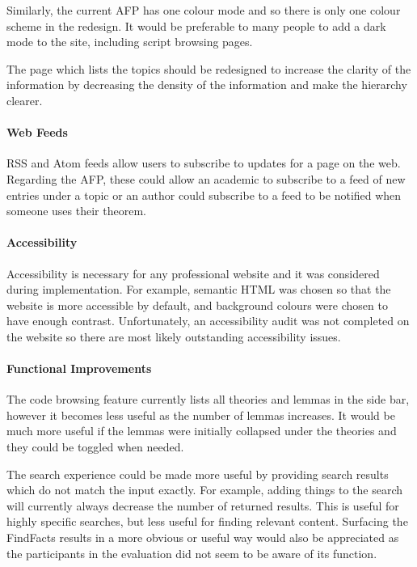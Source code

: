 \documentclass[bsc,frontabs,oneside,singlespacing,parskip,deptreport,logo]{infthesis}
\begin{document}
Similarly, the current AFP has one colour mode and so there is only one colour scheme in the redesign. It would be preferable to many people to add a dark mode to the site, including script browsing pages.

\cbstart
The page which lists the topics should be redesigned to increase the clarity of the information by decreasing the density of the information and make the hierarchy clearer.
\cbend
\paragraph*{Web Feeds}

RSS and Atom feeds allow users to subscribe to updates for a  page on the web. Regarding the AFP, these could allow an academic to subscribe to a feed of new entries under a topic or an author could subscribe to a feed to be notified when someone uses their theorem. 
\cbstart
\paragraph*{Accessibility}

Accessibility is necessary for any professional website \cite{henry_accessibility_2021} and it was considered during implementation. For example, semantic HTML was chosen so that the website is more accessible by default, and background colours were chosen to have enough contrast. Unfortunately, an accessibility audit was not completed on the website so there are most likely outstanding accessibility issues.

\paragraph*{Functional Improvements}

The code browsing feature currently lists all theories and lemmas in the side bar, however it becomes less useful as the number of lemmas increases. It would be much more useful if the lemmas were initially collapsed under the theories and they could be toggled when needed.

The search experience could be made more useful by providing search results which do not match the input exactly. For example, adding things to the search will currently always decrease the number of returned results. This is useful for highly specific searches, but less useful for finding relevant content. Surfacing the FindFacts results in a more obvious or useful way would also be appreciated as the participants in the evaluation did not seem to be aware of its function.
\cbend
\end{document}
